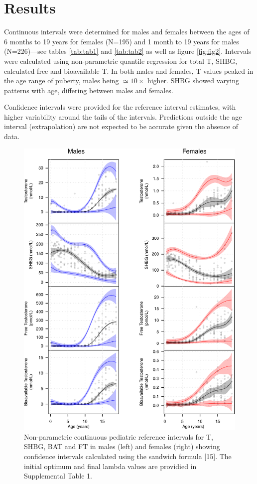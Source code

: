 \documentclass[]{elsarticle} %
\begin{document}
\hypertarget{results}{%
\section{Results}\label{results}}

Continuous intervals were determined for males and females between the
ages of 6 months to 19 years for females (N=195) and 1 month to 19 years
for males (N=226)---see tables \ref{tab:tab1} and \ref{tab:tab2} as well
as figure \ref{fig:fig2}. Intervals were calculated using non-parametric
quantile regression for total T, SHBG, calculated free and bioavailable
T. In both males and females, T values peaked in the age range of
puberty, males being \(\simeq 10 \times\) higher. SHBG showed varying
patterns with age, differing between males and females.

Confidence intervals were provided for the reference interval estimates,
with higher variability around the tails of the intervals. Predictions
outside the age interval (extrapolation) are not expected to be accurate
given the absence of data.

\begin{figure}[H]
\includegraphics{quantregfitsfig2-1} \caption{\label{fig:fig2}Non-parametric continuous pediatric reference intervals for T, SHBG, BAT and FT in males (left) and females (right) showing confidence intervals calculated using the sandwich formula [15]. The initial optimum and final lambda values are providied in Supplemental Table 1.}\label{fig:quantregfitsfig2}
\end{figure}
\end{document}
